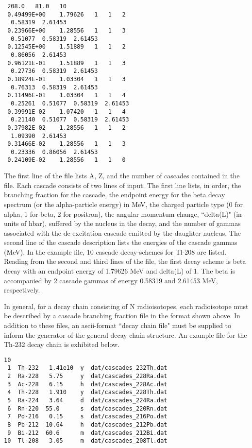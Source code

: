 \begin{lstlisting}
 208.0   81.0   10
 0.49499E+00    1.79626   1   1   2
  0.58319  2.61453
 0.23966E+00    1.28556   1   1   3
  0.51077  0.58319  2.61453
 0.12545E+00    1.51889   1   1   2
  0.86056  2.61453
 0.96121E-01    1.51889   1   1   3
  0.27736  0.58319  2.61453
 0.18924E-01    1.03304   1   1   3
  0.76313  0.58319  2.61453
 0.11496E-01    1.03304   1   1   4
  0.25261  0.51077  0.58319  2.61453
 0.39991E-02    1.07420   1   1   4
  0.21140  0.51077  0.58319  2.61453
 0.37982E-02    1.28556   1   1   2
  1.09390  2.61453
 0.31466E-02    1.28556   1   1   3
  0.23336  0.86056  2.61453
 0.24109E-02    1.28556   1   1   0
\end{lstlisting}

 The first line of the file lists A, Z, and the number of cascades contained
in the file.  Each cascade consists of two lines of input.  The first
line lists, in order, the branching fraction for the cascade, the endpoint
energy for the beta decay spectrum (or the alpha-{}particle energy) in MeV, the 
charged particle type (0 for alpha, 1 for beta, 2 for positron), the angular
momentum change, ``delta(L)" (in units of hbar), suffered by the nucleus in 
the decay, and the number of gammas associated with the de-{}excitation cascade 
emitted by the daughter nucleus.  The second line of the cascade description
lists the energies of the cascade gammas (MeV).  In the example file, 10 
cascade decay-{}schemes for Tl-{}208 are listed.  Reading from the second and 
third lines of the file, the first decay scheme is beta decay with an endpoint
energy of 1.79626 MeV and delta(L) of 1.  The beta is accompanied by 2 cascade
gammas of energy 0.58319 and 2.61453 MeV, respectively.
 

 In general, for a decay chain consisting of N radioisotopes, each radioisotope
must be described by a cascade branching fraction file in the format shown
above.  In addition to these files, an ascii-{}format ``decay chain file" must
be supplied to inform the generator of the general decay chain structure.  An
example file for the Th-{}232 decay chain is exhibited below.
 

\begin{lstlisting}
10
 1  Th-232   1.41e10  y  dat/cascades_232Th.dat
 2  Ra-228   5.75     y  dat/cascades_228Ra.dat
 3  Ac-228   6.15     h  dat/cascades_228Ac.dat
 4  Th-228   1.910    y  dat/cascades_228Th.dat
 5  Ra-224   3.64     d  dat/cascades_224Ra.dat
 6  Rn-220  55.0      s  dat/cascades_220Rn.dat
 7  Po-216   0.15     s  dat/cascades_216Po.dat
 8  Pb-212  10.64     h  dat/cascades_212Pb.dat
 9  Bi-212  60.6      m  dat/cascades_212Bi.dat
10  Tl-208   3.05     m  dat/cascades_208Tl.dat
\end{lstlisting}

